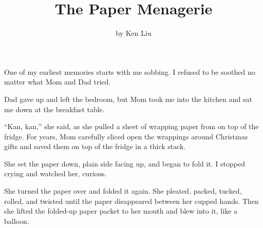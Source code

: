 \documentclass{ctexart}
\title{The Paper Menagerie}
\author{by Ken Liu }
\begin{document}
\maketitle


	
	
	One of my earliest memories starts with me sobbing. I refused to be soothed no matter what Mom and Dad tried. 
	
	Dad gave up and left the bedroom, but Mom took me into the kitchen and sat me down at the breakfast table. 
	
	“Kan, kan,” she said, as she pulled a sheet of wrapping paper from on top of the fridge. For years, Mom carefully sliced open the wrappings around Christmas gifts and saved them on top of the fridge in a thick stack. 
	
	She set the paper down, plain side facing up, and began to fold it. I stopped crying and watched her, curious. 
	
	She turned the paper over and folded it again. She pleated, packed, tucked, rolled, and twisted until the paper disappeared between her cupped hands. Then she lifted the folded-up paper packet to her mouth and blew into it, like a balloon. 
\end{document}
